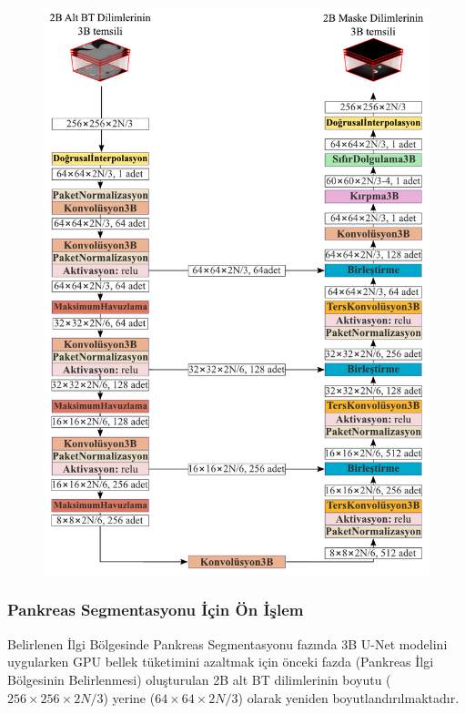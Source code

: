 \begin{figure}[h!]
	\begin{center}
		\vspace{0.4cm}
		{
			\vspace{0.4cm}
			\includegraphics[scale=0.6]{Yapilan-Calismalar/Figures/3dunet.pdf}
		}
	\end{center}
\end{figure} 

\subsubsection{Pankreas Segmentasyonu İçin Ön İşlem}
Belirlenen İlgi Bölgesinde Pankreas Segmentasyonu fazında 3B U-Net modelini uygularken GPU bellek tüketimini azaltmak için önceki fazda (Pankreas İlgi Bölgesinin Belirlenmesi) oluşturulan 2B alt BT dilimlerinin boyutu ($256 \times 256 \times 2N/3$) yerine ($64 \times 64 \times 2N/3$) olarak yeniden boyutlandırılmaktadır.

